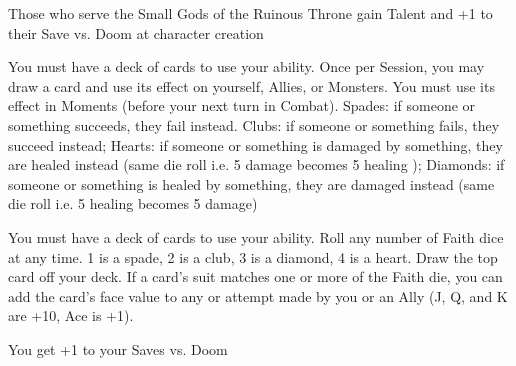 {\newpage







Those who serve the Small Gods of the Ruinous Throne gain \DCUP Talent and +1 to their Save vs. Doom at character creation








\GOD[
Name=Fortuna,
Link=small-god-fortuna,
GodOf=Seraph of Luck,
Holy=a deck of cards
]


You must have a deck of cards to use your ability.  Once per Session, you may draw a card and use its effect on yourself, Allies, or Monsters. You must use its effect in Moments (before your next turn in Combat). Spades: if someone or something succeeds, they fail instead. Clubs: if someone or something fails, they succeed instead; Hearts: if someone or something is damaged by something, they are healed instead (same die roll i.e. 5 damage becomes 5 healing ); Diamonds: if someone or something is healed by something, they are damaged instead (same die roll i.e. 5 healing becomes 5 damage)


You must have a deck of cards to use your ability.  Roll any number of Faith dice at any time.  1 is a spade, 2 is a club, 3 is a diamond, 4 is a heart.  Draw the top card off your deck.  If a card's suit matches one or more of the Faith die, you can add the card's face value to any \RO or \RB attempt made by you or an Ally (J, Q, and K are +10, Ace is +1).




\GOD[
Name=Nergal,
Link=small-god-nergal,
GodOf=God of Dooms,
Holy=an iron mask
]


You get +1 to your Saves vs. Doom

}
